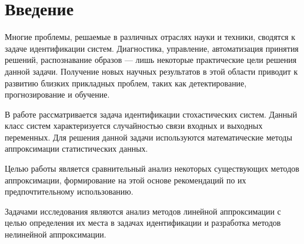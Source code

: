 \chapter*{Введение}

Многие проблемы, решаемые в различных отраслях науки и техники, сводятся к задаче идентификации систем.
Диагностика, управление, автоматизация принятия решений, распознавание образов ---
лишь некоторые практические цели решения данной задачи.
Получение новых научных результатов в этой области приводит к развитию близких прикладных проблем,
таких как детектирование, прогнозирование и обучение.

В работе рассматривается задача идентификации стохастических систем.
Данный класс систем характеризуется случайностью связи входных и выходных переменных.
Для решения данной задачи используются математические методы аппроксимации статистических данных.

Целью работы является сравнительный анализ некоторых существующих методов аппроксимации,
формирование на этой основе рекомендаций по их предпочтительному использованию.

Задачами исследования являются анализ методов линейной аппроксимации с целью определения их
места в задачах идентификации {\color{red} и разработка методов нелинейной аппроксимации}.

